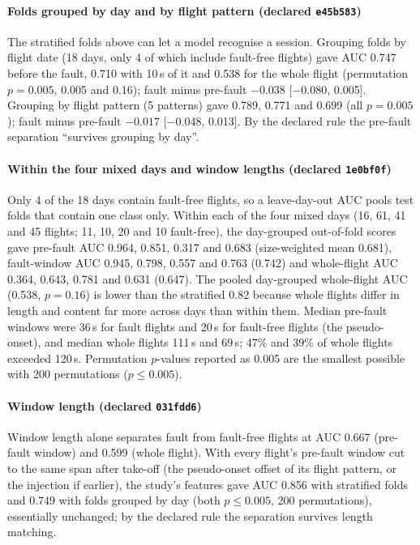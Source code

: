 \documentclass[preprint,12pt]{elsarticle}
\begin{document}
\paragraph{Folds grouped by day and by flight pattern (declared \texttt{e45b583})} The stratified folds above can let a model recognise a session. Grouping folds by flight date (18 days, only 4 of which include fault-free flights) gave AUC 0.747 before the fault, 0.710 with 10\,s of it and 0.538 for the whole flight (permutation $p=0.005$, 0.005 and 0.16); fault minus pre-fault $-0.038$ [$-0.080$, 0.005]. Grouping by flight pattern (5 patterns) gave 0.789, 0.771 and 0.699 (all $p=0.005$); fault minus pre-fault $-0.017$ [$-0.048$, 0.013]. By the declared rule the pre-fault separation ``survives grouping by day''.

\paragraph{Within the four mixed days and window lengths (declared \texttt{1e0bf0f})} Only 4 of the 18 days contain fault-free flights, so a leave-day-out AUC pools test folds that contain one class only. Within each of the four mixed days (16, 61, 41 and 45 flights; 11, 10, 20 and 10 fault-free), the day-grouped out-of-fold scores gave pre-fault AUC 0.964, 0.851, 0.317 and 0.683 (size-weighted mean 0.681), fault-window AUC 0.945, 0.798, 0.557 and 0.763 (0.742) and whole-flight AUC 0.364, 0.643, 0.781 and 0.631 (0.647). The pooled day-grouped whole-flight AUC (0.538, $p=0.16$) is lower than the stratified 0.82 because whole flights differ in length and content far more across days than within them. Median pre-fault windows were 36\,s for fault flights and 20\,s for fault-free flights (the pseudo-onset), and median whole flights 111\,s and 69\,s; 47\% and 39\% of whole flights exceeded 120\,s. Permutation $p$-values reported as 0.005 are the smallest possible with 200 permutations ($p\le0.005$).

\paragraph{Window length (declared \texttt{031fdd6})} Window length alone separates fault from fault-free flights at AUC 0.667 (pre-fault window) and 0.599 (whole flight). With every flight's pre-fault window cut to the same span after take-off (the pseudo-onset offset of its flight pattern, or the injection if earlier), the study's features gave AUC 0.856 with stratified folds and 0.749 with folds grouped by day (both $p\le0.005$, 200 permutations), essentially unchanged; by the declared rule the separation survives length matching.
\FloatBarrier
\end{document}
